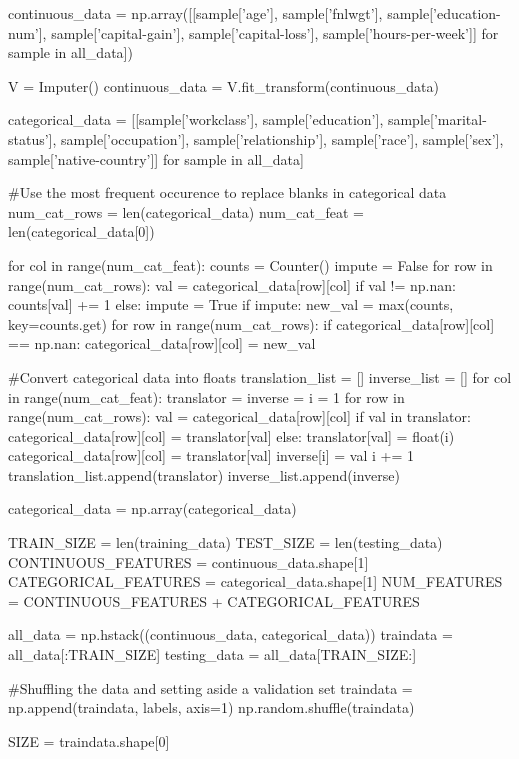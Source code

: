\documentclass{article}
\begin{document}
\begin{python}
continuous_data = np.array([[sample['age'], sample['fnlwgt'],
    sample['education-num'], sample['capital-gain'],
    sample['capital-loss'], sample['hours-per-week']] for sample in all_data])

V = Imputer()
continuous_data = V.fit_transform(continuous_data)

categorical_data = [[sample['workclass'], sample['education'],
    sample['marital-status'], sample['occupation'], sample['relationship'],
    sample['race'], sample['sex'], sample['native-country']] for sample in all_data]

#Use the most frequent occurence to replace blanks in categorical data
num_cat_rows = len(categorical_data)
num_cat_feat = len(categorical_data[0])

for col in range(num_cat_feat):
    counts = Counter()
    impute = False
    for row in range(num_cat_rows):
        val = categorical_data[row][col]
        if val != np.nan:
            counts[val] += 1
        else:
            impute = True
    if impute:
        new_val = max(counts, key=counts.get)
        for row in range(num_cat_rows):
            if categorical_data[row][col] == np.nan:
                categorical_data[row][col] = new_val

#Convert categorical data into floats
translation_list = []
inverse_list = []
for col in range(num_cat_feat):
    translator = {}
    inverse = {}
    i = 1
    for row in range(num_cat_rows):
        val = categorical_data[row][col]
        if val in translator:
            categorical_data[row][col] = translator[val]
        else:
            translator[val] = float(i)
            categorical_data[row][col] = translator[val]
            inverse[i] = val
            i += 1
    translation_list.append(translator)
    inverse_list.append(inverse)

categorical_data = np.array(categorical_data)

TRAIN_SIZE = len(training_data)
TEST_SIZE = len(testing_data)
CONTINUOUS_FEATURES = continuous_data.shape[1]
CATEGORICAL_FEATURES = categorical_data.shape[1]
NUM_FEATURES = CONTINUOUS_FEATURES + CATEGORICAL_FEATURES

all_data = np.hstack((continuous_data, categorical_data))
traindata = all_data[:TRAIN_SIZE]
testing_data = all_data[TRAIN_SIZE:]

#Shuffling the data and setting aside a validation set
traindata = np.append(traindata, labels, axis=1)
np.random.shuffle(traindata)

SIZE = traindata.shape[0]


\end{python}
\end{document}
